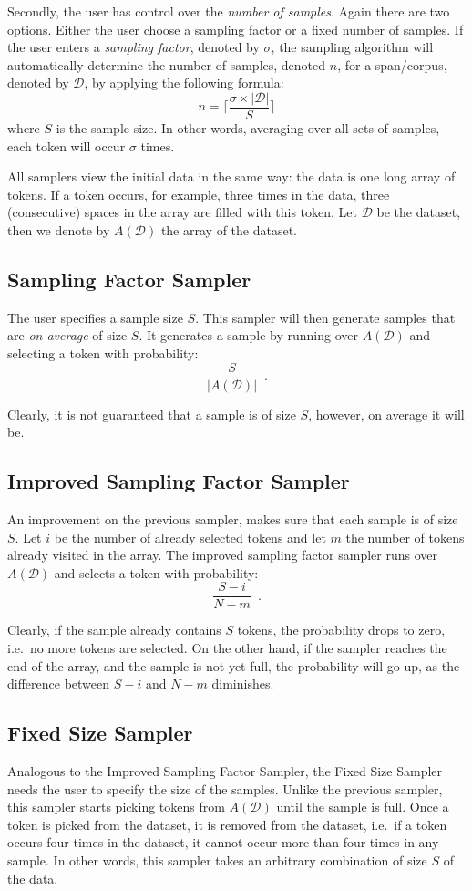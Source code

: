 \documentclass{article}
\begin{document}
Secondly, the user has control over the \emph{number of samples}. Again there are two options. Either the user choose a sampling factor or a fixed number of samples. If the user enters a \emph{sampling factor}, denoted by $\sigma$, the sampling algorithm will automatically determine the number of samples, denoted $n$, for a span/corpus, denoted by $\mathcal{D}$, by applying the following formula: 
$$n = \lceil \frac{\sigma \times |\mathcal{D}|}{S} \rceil$$
where $S$ is the sample size. In other words, averaging over all sets of samples, each token will occur $\sigma$ times. 

All samplers view the initial data in the same way: the data is one long array of tokens. If a token occurs, for example, three times in the data, three (consecutive) spaces in the array are filled with this token. Let $\mathcal{D}$ be the dataset, then we denote by $A(\mathcal{D})$ the array of the dataset.

\subsection{Sampling Factor Sampler}

The user specifies a sample size $S$. This sampler will then generate samples that are \emph{on average} of size $S$. It generates a sample by running over $A(\mathcal{D})$ and selecting a token with probability:
$$\frac{S}{|A(\mathcal{D})|} \enspace.$$

Clearly, it is not guaranteed that a sample is of size $S$, however, on average it will be.



\subsection{Improved Sampling Factor Sampler}

An improvement on the previous sampler, makes sure that each sample is of size $S$. Let $i$ be the number of already selected tokens and let $m$ the number of tokens already visited in the array. The improved sampling factor sampler runs over $A(\mathcal{D})$ and selects a token with probability:
$$\frac{S-i}{N-m} \enspace.$$ 

Clearly, if the sample already contains $S$ tokens, the probability drops to zero, i.e.\ no more tokens are selected. On the other hand, if the sampler reaches the end of the array, and the sample is not yet full, the probability will go up, as the difference between $S-i$ and $N-m$ diminishes.


\subsection{Fixed Size Sampler}

Analogous to the Improved Sampling Factor Sampler, the Fixed Size Sampler needs the user to specify the size of the samples. Unlike the previous sampler, this sampler starts picking tokens from $A(\mathcal{D})$ until the sample is full. Once a token is picked from the dataset, it is removed from the dataset, i.e.\ if a token occurs four times in the dataset, it cannot occur more than four times in any sample. In other words, this sampler takes an arbitrary combination of size $S$ of the data. 
\end{document}
